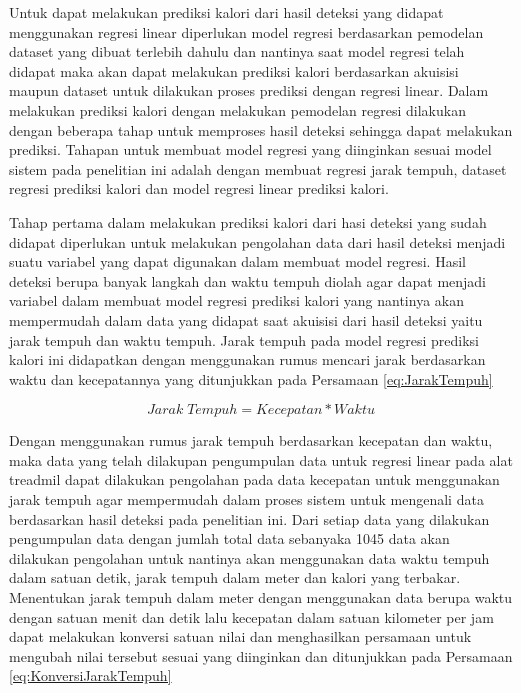 Untuk dapat melakukan prediksi kalori dari hasil deteksi yang didapat menggunakan regresi linear diperlukan model regresi berdasarkan pemodelan dataset yang dibuat terlebih dahulu dan nantinya saat model regresi telah didapat maka akan dapat melakukan prediksi kalori berdasarkan akuisisi maupun dataset untuk dilakukan proses prediksi dengan regresi linear. Dalam melakukan prediksi kalori dengan melakukan pemodelan regresi dilakukan dengan beberapa tahap untuk memproses hasil deteksi sehingga dapat melakukan prediksi. Tahapan untuk membuat model regresi yang diinginkan sesuai model sistem pada penelitian ini adalah dengan membuat regresi jarak tempuh, dataset regresi prediksi kalori dan model regresi linear prediksi kalori.

Tahap pertama dalam melakukan prediksi kalori dari hasi deteksi yang sudah didapat diperlukan untuk melakukan pengolahan data dari hasil deteksi menjadi suatu variabel yang dapat digunakan dalam membuat model regresi. Hasil deteksi berupa banyak langkah dan waktu tempuh diolah agar dapat menjadi variabel dalam membuat model regresi prediksi kalori yang nantinya akan mempermudah dalam data yang didapat saat akuisisi dari hasil deteksi yaitu jarak tempuh dan waktu tempuh. Jarak tempuh pada model regresi prediksi kalori ini didapatkan dengan menggunakan rumus mencari jarak berdasarkan waktu dan kecepatannya yang ditunjukkan pada Persamaan \ref{eq:JarakTempuh}

\begin{equation}
  \label{eq:JarakTempuh}
  Jarak \; Tempuh = Kecepatan*Waktu
\end{equation}

Dengan menggunakan rumus jarak tempuh berdasarkan kecepatan dan waktu, maka data yang telah dilakupan pengumpulan data untuk regresi linear pada alat treadmil dapat dilakukan pengolahan pada data kecepatan untuk menggunakan jarak tempuh agar mempermudah dalam proses sistem untuk mengenali data berdasarkan hasil deteksi pada penelitian ini. Dari setiap data yang dilakukan pengumpulan data dengan jumlah total data sebanyaka 1045 data akan dilakukan pengolahan untuk nantinya akan menggunakan data waktu tempuh dalam satuan detik, jarak tempuh dalam meter dan kalori yang terbakar. Menentukan jarak tempuh dalam meter dengan menggunakan data berupa waktu dengan satuan menit dan detik lalu kecepatan dalam satuan kilometer per jam dapat melakukan konversi satuan nilai dan menghasilkan persamaan untuk mengubah nilai tersebut sesuai yang diinginkan dan ditunjukkan pada Persamaan \ref{eq:KonversiJarakTempuh}

